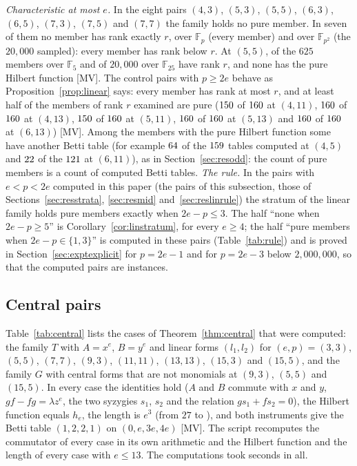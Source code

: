 \documentclass[11pt]{article}
\theoremstyle{definition}
\theoremstyle{remark}
\newcommand{\F}{\mathbb{F}}
\begin{document}
\emph{Characteristic at most $e$.} In the eight pairs $(4,3)$, $(5,3)$, $(5,5)$, $(6,3)$, $(6,5)$, $(7,3)$, $(7,5)$ and $(7,7)$ the family holds no pure member. In seven of them no member has rank exactly $r$, over $\F_p$ (every member) and over $\F_{p^2}$ (the $20{,}000$ sampled): every member has rank below $r$. At $(5,5)$, \nlfFiveFiveRankR{} of the $625$ members over $\F_5$ and \nlfYFiveFiveRankR{} of $20{,}000$ over $\F_{25}$ have rank $r$, and none has the pure Hilbert function [MV]. The control pairs with $p\ge2e$ behave as Proposition~\ref{prop:linear} says: every member has rank at most $r$, and at least half of the members of rank $r$ examined are pure ($150$ of $160$ at $(4,11)$, $160$ of $160$ at $(4,13)$, $150$ of $160$ at $(5,11)$, $160$ of $160$ at $(5,13)$ and $160$ of $160$ at $(6,13)$) [MV]. Among the members with the pure Hilbert function some have another Betti table (for example $64$ of the $159$ tables computed at $(4,5)$ and $22$ of the $121$ at $(6,11)$), as in Section~\ref{sec:resodd}: the count of pure members is a count of computed Betti tables. \emph{The rule.} In the pairs with $e<p<2e$ computed in this paper (the pairs of this subsection, those of Sections~\ref{sec:resstrata}, \ref{sec:resmid} and~\ref{sec:reslinrule}) the stratum of the linear family holds pure members exactly when $2e-p\le3$. The half ``none when $2e-p\ge5$'' is Corollary~\ref{cor:linstratum}, for every $e\ge4$; the half ``pure members when $2e-p\in\{1,3\}$'' is computed in these pairs (Table~\ref{tab:rule}) and is proved in Section~\ref{sec:exptexplicit} for $p=2e-1$ and for $p=2e-3$ below $2{,}000{,}000$, so that the computed pairs are instances.

\subsection{Central pairs}
\label{sec:rescen}

Table~\ref{tab:central} lists the \ncenCases{} cases of Theorem~\ref{thm:central} that were computed: the family $T$ with $A=x^e$, $B=y^e$ and linear forms $(l_1,l_2)$ for $(e,p)=(3,3)$, $(5,5)$, $(7,7)$, $(9,3)$, $(11,11)$, $(13,13)$, $(15,3)$ and $(15,5)$, and the family $G$ with central forms that are not monomials at $(9,3)$, $(5,5)$ and $(15,5)$. In every case the identities hold ($A$ and $B$ commute with $x$ and $y$, $gf-fg=\lambda z^e$, the two syzygies $s_1$, $s_2$ and the relation $gs_1+fs_2=0$), the Hilbert function equals $h_e$, the length is $e^3$ (from $27$ to \ncenMaxLength{}), and both instruments give the Betti table $(1,2,2,1)$ on $(0,e,3e,4e)$ [MV]. The script recomputes the commutator of every case in its own arithmetic and the Hilbert function and the length of every case with $e\le13$. The computations took \ncenSeconds{} seconds in all.
\end{document}
